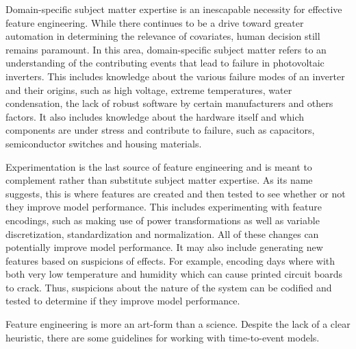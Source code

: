 Domain-specific subject matter expertise is an inescapable necessity for effective feature engineering. While there continues to be a drive toward greater automation in determining the relevance of covariates, human decision still remains paramount. In this area, domain-specific subject matter refers to an understanding of the contributing events that lead to failure in photovoltaic inverters. This includes knowledge about the various failure modes of an inverter and their origins, such as high voltage, extreme temperatures, water condensation, the lack of robust software by certain manufacturers and others factors. It also includes knowledge about the hardware itself and which components are under stress and contribute to failure, such as capacitors, semiconductor switches and housing materials\cite{Flicker2014}.

Experimentation is the last source of feature engineering and is meant to complement rather than substitute subject matter expertise. As its name suggests, this is where features are created and then tested to see whether or not they improve model performance. This includes experimenting with feature encodings, such as making use of power transformations as well as variable discretization, standardization and normalization. All of these changes can potentially improve model performance. It may also include generating new features based on suspicions of effects. For example, encoding days where with both very low temperature and humidity which can cause printed circuit boards to crack. Thus, suspicions about the nature of the system can be codified and tested to determine if they improve model performance. 

Feature engineering is more an art-form than a science. Despite the lack of a clear heuristic, there are some guidelines for working with time-to-event models. 


